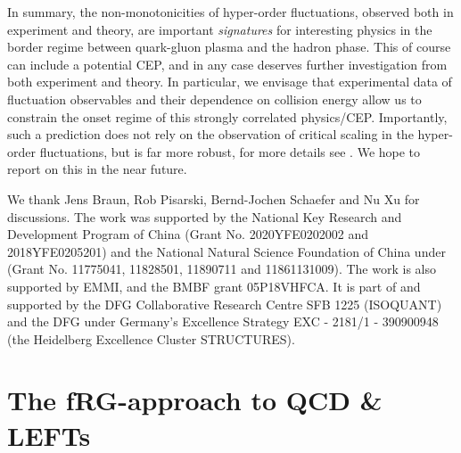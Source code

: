 \documentclass[%
reprint,
superscriptaddress,
showpacs,preprintnumbers,
amsmath,amssymb,
aps,
prd,
]{revtex4-1}
\def\sec#1{\Cref{#1}}
\begin{document}
In summary, the non-monotonicities of hyper-order fluctuations, observed both in experiment and theory, are important  \textit{signatures} for interesting physics in the border regime between quark-gluon plasma and the hadron phase. This of course can include a potential CEP, and in any case deserves further investigation from both experiment and theory. In particular, we envisage that experimental data of fluctuation observables and their dependence on collision energy allow us to constrain the onset regime of this strongly correlated physics/CEP. Importantly, such a prediction does not rely on the observation of critical scaling in the hyper-order fluctuations, but is far more robust, for more details see  \sec{sec:CEP}. We hope to report on this in the near future. 





\begin{acknowledgments}
%
We thank Jens Braun, Rob Pisarski, Bernd-Jochen Schaefer and Nu Xu for discussions. The work was supported by the National Key Research and Development Program of China (Grant No. 2020YFE0202002 and 2018YFE0205201) and the National Natural Science Foundation of China under (Grant No. 11775041, 11828501, 11890711 and 11861131009). The work is also supported by EMMI, and the BMBF grant 05P18VHFCA. It is part of and supported by the DFG Collaborative Research Centre SFB 1225 (ISOQUANT) and the DFG under Germany’s Excellence Strategy EXC - 2181/1 - 390900948 (the Heidelberg Excellence Cluster STRUCTURES).
%

\end{acknowledgments}

	
\appendix


\section{The fRG-approach to QCD \& LEFTs}\label{app:fRG}
	
\end{document}
